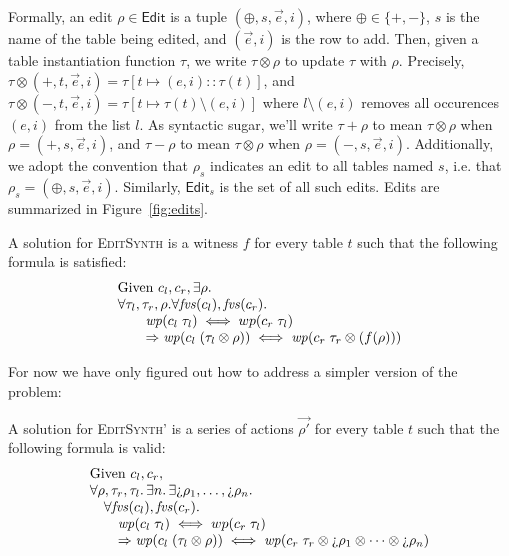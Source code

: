 Formally, an edit $\rho \in \mathsf{Edit}$ is a tuple
$(\oplus,s,\vec e,i)$, where $\oplus \in \{+,-\}$, $s$ is the name of
the table being edited, and $(\vec e, i)$ is the row to add. Then,
given a table instantiation function $\tau$, we write
$\tau \otimes \rho$ to update $\tau$ with $\rho$. Precisely,
$\tau \otimes (+,t,\vec e, i) = \tau[t \mapsto (e,i)::\tau(t)]$, and
$\tau \otimes (-, t, \vec e, i) = \tau[t \mapsto \tau(t) \setminus
(e,i)]$ where $l \setminus (e,i)$ removes all occurences $(e,i)$ from
the list $l$. As syntactic sugar, we'll write $\tau + \rho$ to mean
$\tau \otimes \rho$ when $\rho = (+, s, \vec e, i)$, and $\tau - \rho$
to mean $\tau \otimes \rho$ when $\rho = (-, s, \vec e,
i)$. Additionally, we adopt the convention that $\rho_s$ indicates an
edit to all tables named $s$, i.e. that
$\rho_s = (\oplus, s, \vec e, i)$. Similarly, $\mathsf{Edit}_s$ is the
set of all such edits. Edits are summarized in Figure~\ref{fig:edits}.



A solution for \textsc{EditSynth} is a witness $f$ for every table $t$ such that
the following formula is satisfied:
\[\begin{array}{l}
    \text{Given } c_l,c_r, \exists \rho. \\
    \forall \tau_l,\tau_r,\rho. \forall \mathit{fvs}(c_l), \mathit{fvs}(c_r). \\
    \qquad \mathit{wp}(c_l\; \tau_l) \iff wp(c_r\; \tau_l) \\
    \qquad \Rightarrow \mathit{wp}(c_l\; (\tau_l \otimes \rho)) \iff \mathit{wp}(c_r\; \tau_r \otimes (f(\rho)))
  \end{array}\]

For now we have only figured out how to address a simpler version of the
problem:

A solution for \textsc{EditSynth'} is a series of actions $\vec{\rho'}$ for every table $t$ such that
the following formula is valid:
\[\begin{array}{l}
    \text{Given } c_l,c_r, \\
    \forall \rho, \tau_r, \tau_l.\, \exists n.\, \exists \hole\rho_1,\ldots,\hole\rho_n. \\ 
    \quad \forall \fvs(c_l), \fvs(c_r). \\
    \qquad \wp(c_l\; \tau_l) \iff wp(c_r\; \tau_l) \\
    \qquad \Rightarrow \wp(c_l\; (\tau_l \otimes \rho)) \iff \wp(c_r\; \tau_r
    \otimes \hole\rho_1 \otimes \cdots \otimes \hole\rho_n )
  \end{array}\]

